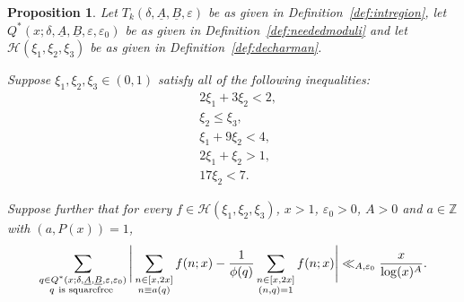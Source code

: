 \documentclass{amsart}
\newtheorem{prop}{Proposition}
\numberwithin{equation}{section}
\begin{document}
\begin{prop} \label{prop:harman}
Let  $T_k(\delta,\underline{A},\underline{B},\varepsilon)$ be as given in Definition~\ref{def:intregion}, let 
$Q^*(x;\delta,\underline{A},\underline{B},\varepsilon,\varepsilon_0)$ be as given in Definition~\ref{def:neededmoduli} and let $\mathcal{H}(\xi_1,\xi_2,\xi_3)$ be as given in Definition~\ref{def:decharman}.


Suppose $\xi_1, \xi_2, \xi_3 \in (0,1)$ satisfy all of the following inequalities:
\begin{align*}
& 2\xi_1 + 3\xi_2   <2, \\
& \xi_2 \leq \xi_3,\\
&\xi_1+ 9\xi_2 < 4, \\
&2\xi_1+ \xi_2>1,\\
&17 \xi_2 < 7.
\end{align*}

Suppose  further that for every $f \in \mathcal{H}(\xi_1,\xi_2,\xi_3)$,  $x>1$, $\varepsilon_0 >0$, $A>0$ and    $a\in \mathbb{Z}$  with $(a,P(x))=1$,   
\begin{align}\label{inequ:harmrequ}
\sum_{\substack{q \in Q^*(x;\delta,\underline{A},\underline{B},\varepsilon,\varepsilon_0) \\  q \mbox{ \scriptsize  is squarefree  }   }}  \Bigg| \sum_{\substack{n \in [x,2x] \\ n \equiv a (q)}} f(n;x) - \dfrac{1}{\phi(q)} \sum_{\substack{ n \in [x,2x] \\ (n,q)=1}}f(n;x) \Bigg| \ll_{A,\varepsilon_0} \dfrac{x}{\log(x)^A}.
\end{align}
 




\end{prop}
\end{document}
